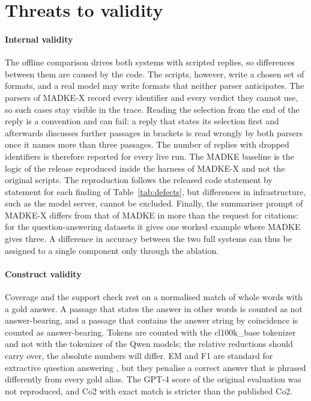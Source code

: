 \section{Threats to validity}
\label{sec:threats}

\paragraph{Internal validity}
The offline comparison drives both systems with scripted replies, so differences between them are caused by the code. The scripts, however, write a chosen set of formats, and a real model may write formats that neither parser anticipates. The parsers of MADKE-X record every identifier and every verdict they cannot use, so such cases stay visible in the trace. Reading the selection from the end of the reply is a convention and can fail: a reply that states its selection first and afterwards discusses further passages in brackets is read wrongly by both parsers once it names more than three passages. The number of replies with dropped identifiers is therefore reported for every live run. The MADKE baseline is the logic of the release reproduced inside the harness of MADKE-X and not the original scripts. The reproduction follows the released code statement by statement for each finding of Table~\ref{tab:defects}, but differences in infrastructure, such as the model server, cannot be excluded. Finally, the summariser prompt of MADKE-X differs from that of MADKE in more than the request for citations: for the question-answering datasets it gives one worked example where MADKE gives three. A difference in accuracy between the two full systems can thus be assigned to a single component only through the ablation.

\paragraph{Construct validity}
Coverage and the support check rest on a normalised match of whole words with a gold answer. A passage that states the answer in other words is counted as not answer-bearing, and a passage that contains the answer string by coincidence is counted as answer-bearing. Tokens are counted with the cl100k\_base tokenizer and not with the tokenizer of the Qwen models; the relative reductions should carry over, the absolute numbers will differ. EM and F1 are standard for extractive question answering \cite{rajpurkar2016squad}, but they penalise a correct answer that is phrased differently from every gold alias. The GPT-4 score of the original evaluation was not reproduced, and Co2 with exact match is stricter than the published Co2.

